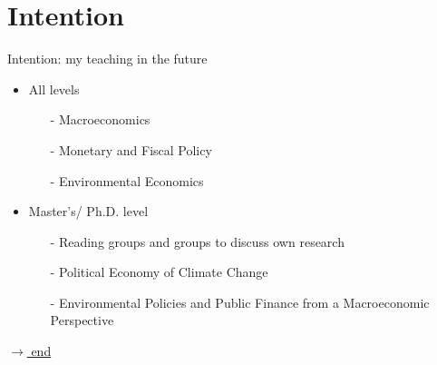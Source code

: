 \hypertarget{int}{}
\section*{Intention}
\begin{frame}{Intention: my teaching in the future}
\vspace{10mm}

\begin{itemize}[<+->]
	\item All levels
	\begin{itemize}
		\item[-] Macroeconomics
		\item[-] Monetary and Fiscal Policy
		\item[-] Environmental Economics 
	\end{itemize}
\vspace{2mm}
	\item Master's/ Ph.D. level
	\begin{itemize}
		\item[-] Reading groups and groups to discuss own research
		\item[-] Political Economy of Climate Change
		\item[-] \alert{Environmental Policies and Public Finance from a Macroeconomic Perspective}
	\end{itemize}
\end{itemize}

\vspace{16mm}
\hfill \hyperlink{end}{\tiny{$\rightarrow$ end}}
\end{frame}
